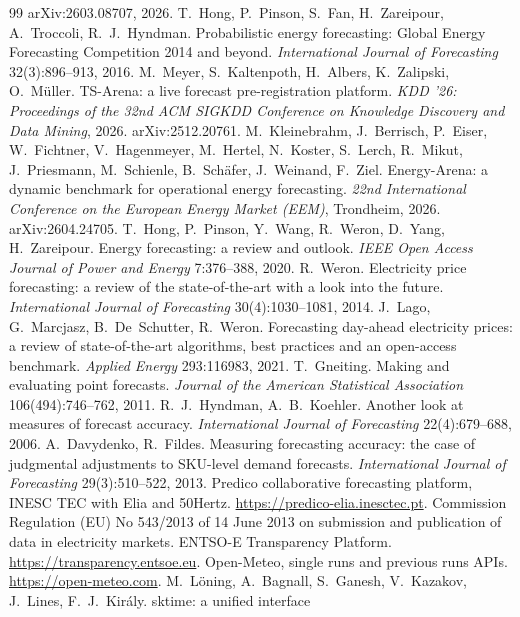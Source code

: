 \documentclass[11pt,a4paper]{article}
\begin{document}
\begin{thebibliography}{99}
arXiv:2603.08707, 2026.
 T.~Hong, P.~Pinson, S.~Fan, H.~Zareipour, A.~Troccoli, R.~J.~Hyndman. Probabilistic energy
forecasting: Global Energy Forecasting Competition 2014 and beyond. \emph{International Journal of Forecasting}
32(3):896--913, 2016.
 M.~Meyer, S.~Kaltenpoth, H.~Albers, K.~Zalipski, O.~Müller. TS-Arena: a live forecast
pre-registration platform. \emph{KDD '26: Proceedings of the 32nd ACM SIGKDD Conference on Knowledge Discovery and
Data Mining}, 2026. arXiv:2512.20761.
 M.~Kleinebrahm, J.~Berrisch, P.~Eiser, W.~Fichtner, V.~Hagenmeyer, M.~Hertel, N.~Koster,
S.~Lerch, R.~Mikut, J.~Priesmann, M.~Schienle, B.~Schäfer, J.~Weinand, F.~Ziel. Energy-Arena: a dynamic benchmark for
operational energy forecasting. \emph{22nd International Conference on the European Energy Market (EEM)}, Trondheim,
2026. arXiv:2604.24705.
 T.~Hong, P.~Pinson, Y.~Wang, R.~Weron, D.~Yang, H.~Zareipour. Energy forecasting: a review and
outlook. \emph{IEEE Open Access Journal of Power and Energy} 7:376--388, 2020.
 R.~Weron. Electricity price forecasting: a review of the state-of-the-art with a look into the future.
\emph{International Journal of Forecasting} 30(4):1030--1081, 2014.
 J.~Lago, G.~Marcjasz, B.~De~Schutter, R.~Weron. Forecasting day-ahead electricity prices: a review of
state-of-the-art algorithms, best practices and an open-access benchmark. \emph{Applied Energy} 293:116983, 2021.
 T.~Gneiting. Making and evaluating point forecasts. \emph{Journal of the American Statistical
Association} 106(494):746--762, 2011.
 R.~J.~Hyndman, A.~B.~Koehler. Another look at measures of forecast accuracy.
\emph{International Journal of Forecasting} 22(4):679--688, 2006.
 A.~Davydenko, R.~Fildes. Measuring forecasting accuracy: the case of judgmental adjustments to
SKU-level demand forecasts. \emph{International Journal of Forecasting} 29(3):510--522, 2013.
 Predico collaborative forecasting platform, INESC TEC with Elia and 50Hertz.
\url{https://predico-elia.inesctec.pt}.
 Commission Regulation (EU) No 543/2013 of 14 June 2013 on submission and publication of data in
electricity markets.
 ENTSO-E Transparency Platform. \url{https://transparency.entsoe.eu}.
 Open-Meteo, single runs and previous runs APIs. \url{https://open-meteo.com}.
 M.~Löning, A.~Bagnall, S.~Ganesh, V.~Kazakov, J.~Lines, F.~J.~Király. sktime: a unified interface

\end{thebibliography}
\end{document}
